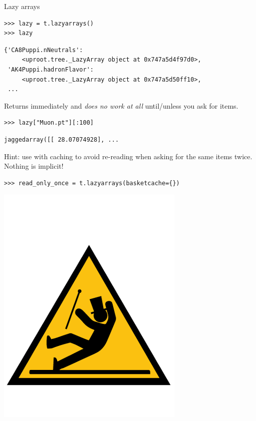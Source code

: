 \documentclass[aspectratio=169]{beamer}
\begin{document}
\begin{frame}[fragile]{Lazy arrays}
\vspace{0.1 cm}
\small
\begin{verbatim}
>>> lazy = t.lazyarrays()
>>> lazy
\end{verbatim}
\begin{verbatim}
{'CA8Puppi.nNeutrals':
     <uproot.tree._LazyArray object at 0x747a5d4f97d0>,
 'AK4Puppi.hadronFlavor':
     <uproot.tree._LazyArray object at 0x747a5d50ff10>,
 ...
\end{verbatim}

\vspace{0.25 cm}
{\normalsize Returns immediately and {\it does no work at all} until/unless you ask for items.}

\vspace{0.25 cm}
\begin{verbatim}
>>> lazy["Muon.pt"][:100]
\end{verbatim}
\begin{verbatim}
jaggedarray([[ 28.07074928], ...
\end{verbatim}

\vspace{0.25 cm}
{\normalsize Hint: use with caching to avoid re-reading when asking for the same items twice. Nothing is implicit!}
\begin{verbatim}
>>> read_only_once = t.lazyarrays(basketcache={})
\end{verbatim}

\vspace{-7.7 cm}
\hfill \includegraphics[width=1.5 cm]{caution.png}\hspace{-0.9 cm}
\vspace{7.7 cm}
\end{frame}
\end{document}
